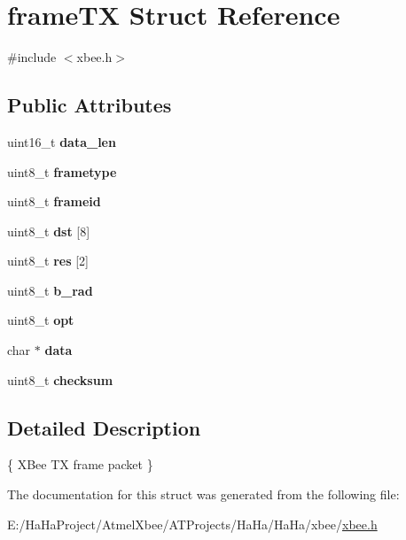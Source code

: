\hypertarget{structframe_t_x}{}\section{frame\+TX Struct Reference}
\label{structframe_t_x}


{\ttfamily \#include $<$xbee.\+h$>$}

\subsection*{Public Attributes}
\begin{DoxyCompactItemize}
\item 
\mbox{\label{structframe_t_x_ae97c6c32cae2233e9a532f3f18acb87a}} 
uint16\+\_\+t {\bfseries data\+\_\+len}
\item 
\mbox{\label{structframe_t_x_ae0184264e132f9acfedd9d73e067d749}} 
uint8\+\_\+t {\bfseries frametype}
\item 
\mbox{\label{structframe_t_x_a81728989f69fb448c3107efe57d9acee}} 
uint8\+\_\+t {\bfseries frameid}
\item 
\mbox{\label{structframe_t_x_ac6af0f89587bfdd91eabbc1664ed0b18}} 
uint8\+\_\+t {\bfseries dst} \mbox{[}8\mbox{]}
\item 
\mbox{\label{structframe_t_x_aaa8e3f6c37ba7164586ece2aa05d02d1}} 
uint8\+\_\+t {\bfseries res} \mbox{[}2\mbox{]}
\item 
\mbox{\label{structframe_t_x_a9902ea07b8e5fc897038c4a78c052d46}} 
uint8\+\_\+t {\bfseries b\+\_\+rad}
\item 
\mbox{\label{structframe_t_x_a683e80dc13eeb1ab084dcc79deea00a1}} 
uint8\+\_\+t {\bfseries opt}
\item 
\mbox{\label{structframe_t_x_a03427b6b3acbd35f51927438a3366cb5}} 
char $\ast$ {\bfseries data}
\item 
\mbox{\label{structframe_t_x_ac11d9bcebc8ed64242ac82e05b1bcf43}} 
uint8\+\_\+t {\bfseries checksum}
\end{DoxyCompactItemize}


\subsection{Detailed Description}
\{ X\+Bee TX frame packet \} 

The documentation for this struct was generated from the following file\+:\begin{DoxyCompactItemize}
\item 
E\+:/\+Ha\+Ha\+Project/\+Atmel\+Xbee/\+A\+T\+Projects/\+Ha\+Ha/\+Ha\+Ha/xbee/\hyperlink{xbee_8h}{xbee.\+h}\end{DoxyCompactItemize}
